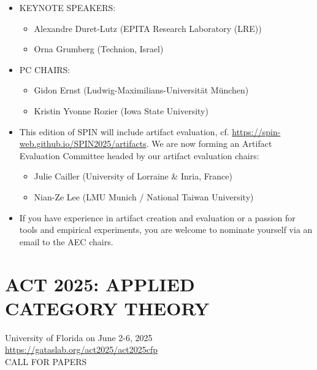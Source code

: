 \documentclass[prodmode,acmtecs]{acmsmall} %
\begin{document}
\begin{itemize}
\item  KEYNOTE SPEAKERS:   
 
\begin{itemize}\item  Alexandre Duret-Lutz (EPITA Research Laboratory (LRE))
\item  Orna Grumberg (Technion, Israel)
\end{itemize} 
\item  PC CHAIRS: 
 
\begin{itemize}\item  Gidon Ernst (Ludwig-Maximilians-Universität München)
\item  Kristin Yvonne Rozier (Iowa State University) 
\end{itemize} 
\item  This edition of SPIN will include artifact evaluation, cf. \href{https://spin-web.github.io/SPIN2025/artifacts}{https://spin-web.github.io/SPIN2025/artifacts}. We are now forming an Artifact Evaluation Committee headed by our artifact evaluation chairs: 
 
\begin{itemize}\item  Julie Cailler (University of Lorraine \& Inria, France)
\item  Nian-Ze Lee (LMU Munich / National Taiwan University)
\end{itemize} 
\item  If you have experience in artifact creation and evaluation or a passion for tools and empirical experiments, you are welcome to nominate yourself via an email to the AEC chairs. 
 
\end{itemize}\section{ACT 2025: APPLIED CATEGORY THEORY  }\label{ACT2025}  University of Florida on June 2-6, 2025\\ 
  \href{https://gataslab.org/act2025/act2025cfp}{https://gataslab.org/act2025/act2025cfp}\\ 
CALL FOR PAPERS 
\end{document}
